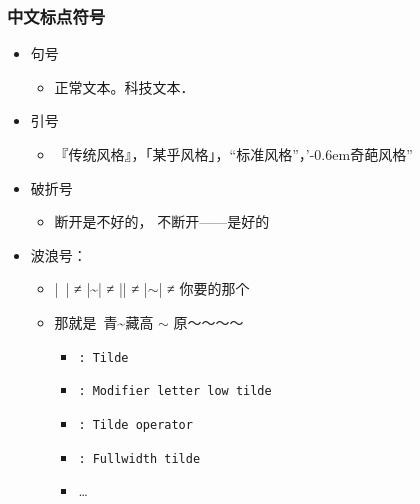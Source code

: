 \begin{frame}[fragile]
\frametitle{中文标点符号}
\begin{itemize}
  \item<+-> 句号

    \begin{itemize}
      \item 正常文本。科技文本．
    \end{itemize}

  \item<+-> 引号

    \begin{itemize}
      \item 『传统风格』，「某乎风格」，“标准风格”，\mbox{}’\kern-0.6em奇葩风格”
    \end{itemize}

  \item<+-> 破折号

    \begin{itemize}
      \item 断开{\SourceHanSerif{}}是不好的，
            不断开——是好的
    \end{itemize}

  \item<+-> 波浪号：

    \begin{itemize}
      \item |~| ≠ |\textasciitilde| ≠ |\texttildelow| ≠ |$\sim$| ≠ 你要的那个
      \item 那就是~青\textasciitilde 藏\texttildelow 高 $\sim$ 原～～～～

        \begin{itemize}
          \item \texttt{: Tilde}
          \item \texttt{: Modifier letter low tilde}
          \item \texttt{: Tilde operator}
          \item \texttt{: Fullwidth tilde}
          \item \ldots{}
        \end{itemize}
    \end{itemize}
\end{itemize}
\end{frame}

